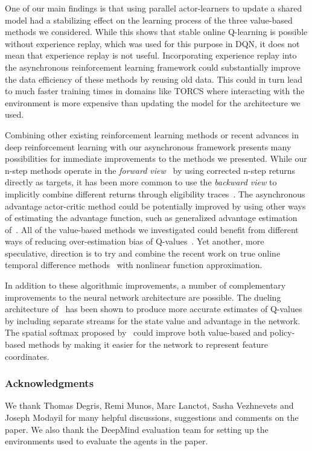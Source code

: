 \documentclass{article} \usepackage{times}
\begin{document}
One of our main findings is that using parallel actor-learners to update a shared model had a stabilizing effect on the learning process of the three value-based methods we considered.
While this shows that stable online Q-learning is possible without experience replay, which was used for this purpose in DQN, it does not mean that experience replay is not useful.
Incorporating experience replay into the asynchronous reinforcement learning framework could substantially improve the data efficiency of these methods by reusing old data.
This could in turn lead to much faster training times in domains like TORCS where interacting with the environment is more expensive than updating the model for the architecture we used.

Combining other existing reinforcement learning methods or recent advances in deep reinforcement learning with our asynchronous framework presents many possibilities for immediate improvements to the methods we presented.
While our n-step methods operate in the \emph{forward view}~\citep{sutton:book} by using corrected n-step returns directly as targets, it has been more common to use the \emph{backward view} to implicitly combine different returns through eligibility traces~\citep{watkins1989learning,sutton:book,peng1996msq}.
The asynchronous advantage actor-critic method could be potentially improved by using other ways of estimating the advantage function, such as generalized advantage estimation of~\cite{schulman2015gae}.
All of the value-based methods we investigated could benefit from different ways of reducing over-estimation bias of Q-values~\citep{hado2015doubledqn,bellemare2016gap}.
Yet another, more speculative, direction is to try and combine the recent work on true online temporal difference methods~\citep{seijen2015true} with nonlinear function approximation.

In addition to these algorithmic improvements, a number of complementary improvements to the neural network architecture are possible.
The dueling architecture of~\cite{wang2015dueling} has been shown to produce more accurate estimates of Q-values by including separate streams for the state value and advantage in the network.
The spatial softmax proposed by~\cite{levine2015endtoend} could improve both value-based and policy-based methods by making it easier for the network to represent feature coordinates.
 
\subsubsection*{Acknowledgments}
We thank Thomas Degris, Remi Munos, Marc Lanctot, Sasha Vezhnevets and Joseph Modayil for many helpful discussions, suggestions and comments on the paper.
We also thank the DeepMind evaluation team for setting up the environments used to evaluate the agents in the paper.
\clearpage


\end{document}
